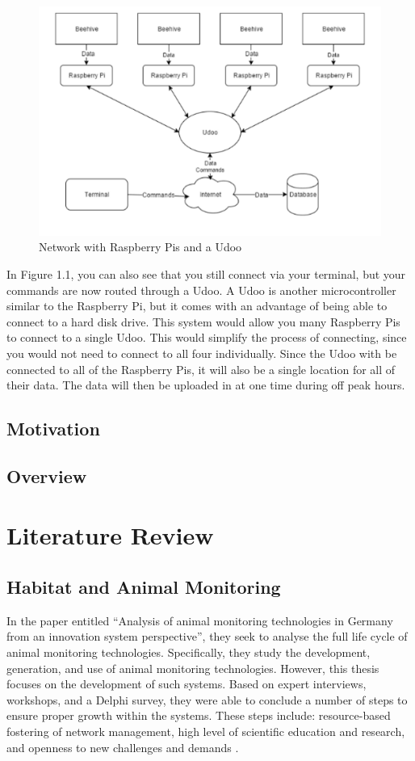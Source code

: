 \begin{figure}
    \centering
    \includegraphics{udoo}
    \caption{Network with Raspberry Pis and a Udoo}
    \label{fig:my_label}
\end{figure}


In Figure 1.1, you can also see that you still connect via your terminal, but your commands are now routed through a Udoo. A Udoo is another microcontroller similar to the Raspberry Pi, but it comes with an advantage of being able to connect to a hard disk drive. This system would allow you many Raspberry Pis to connect to a single Udoo. This would simplify the process of connecting, since you would not need to connect to all four individually. Since the Udoo with be connected to all of the Raspberry Pis, it will also be a single location for all of their data. The data will then be uploaded in at one time during off peak hours.

\section{Motivation}

\section{Overview}

\chapter{Literature Review}
\section{Habitat and Animal Monitoring}
In the paper entitled “Analysis of animal monitoring technologies in Germany from an innovation system perspective”, they seek to analyse the full life cycle of animal monitoring technologies. Specifically, they study the development, generation, and use of animal monitoring technologies. However, this thesis focuses on the development of such systems. Based on expert interviews, workshops, and a Delphi survey, they were able to conclude a number of steps to ensure proper growth within the systems. These steps include: resource-based fostering of network management, high level of scientific education and research, and openness to new challenges and demands \cite{busse_analysis_2015}. 


